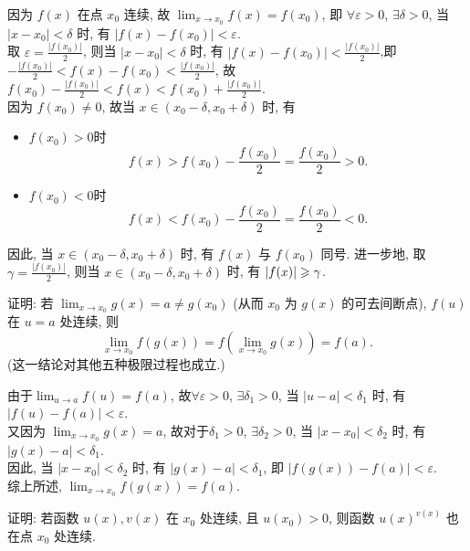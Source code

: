 \begin{solution}
    因为 $f(x)$ 在点 $x_0$ 连续, 故 $\lim_{x \to x_0} f(x) = f(x_0)$, 即 $\forall \varepsilon > 0$, $\exists \delta > 0$, 当 $|x-x_0| < \delta$ 时, 有 $|f(x)-f(x_0)| < \varepsilon$. \\
    取 $\varepsilon = \frac{|f(x_0)|}{2}$, 则当 $|x-x_0| < \delta$ 时, 有 $|f(x)-f(x_0)| < \frac{|f(x_0)|}{2}$,即 $-\frac{|f(x_0)|}{2} < f(x)-f(x_0) < \frac{|f(x_0)|}{2}$, 故 $f(x_0)-\frac{|f(x_0)|}{2} < f(x) < f(x_0)+\frac{|f(x_0)|}{2}$. \\
    因为 $f(x_0) \ne 0$, 故当 $x \in (x_0-\delta, x_0+\delta)$ 时, 有
    \begin{itemize}
        \item $f(x_0) > 0$时$$ f(x) > f(x_0) - \frac{f(x_0)}{2} = \frac{f(x_0)}{2} > 0. $$
        \item $f(x_0) < 0$时$$ f(x) < f(x_0) - \frac{f(x_0)}{2} = \frac{f(x_0)}{2} < 0. $$
    \end{itemize}
    
    因此, 当 $x \in (x_0-\delta, x_0+\delta)$ 时, 有 $f(x)$ 与 $f(x_0)$ 同号. 进一步地, 取 $\gamma = \frac{|f(x_0)|}{2}$, 则当 $x \in (x_0-\delta, x_0+\delta)$ 时, 有 $|f(x)| \geqslant \gamma$.
\end{solution}

\begin{exercise}[2.1.12]
    证明: 若 $\lim_{x \to x_0} g(x) = a \ne g(x_0)$ (从而 $x_0$ 为 $g(x)$ 的可去间断点), $f(u)$ 在 $u=a$ 处连续, 则
    $$ \lim_{x \to x_0} f(g(x)) = f\left(\lim_{x \to x_0} g(x)\right) = f(a). $$
    (这一结论对其他五种极限过程也成立.)
\end{exercise}

\begin{solution}
    由于$\lim_{u \to a} f(u) = f(a)$, 故$\forall \varepsilon > 0$, $\exists \delta_1 > 0$, 当 $|u-a| < \delta_1$ 时, 有 $|f(u)-f(a)| < \varepsilon$. \\
    又因为 $\lim_{x \to x_0} g(x) = a$, 故对于$ \delta_1 > 0$, $\exists \delta_2 > 0$, 当 $|x-x_0| < \delta_2$ 时, 有 $|g(x)-a| < \delta_1$.\\
    因此, 当 $|x-x_0| < \delta_2$ 时, 有 $|g(x)-a| < \delta_1$, 即 $|f(g(x))-f(a)| < \varepsilon$.\\
    综上所述, $\lim_{x \to x_0} f(g(x)) = f(a)$.
\end{solution}

\begin{exercise}[2.1.13]
    证明: 若函数 $u(x), v(x)$ 在 $x_0$ 处连续, 且 $u(x_0) > 0$, 则函数 $u(x)^{v(x)}$ 也在点 $x_0$ 处连续.
\end{exercise}

